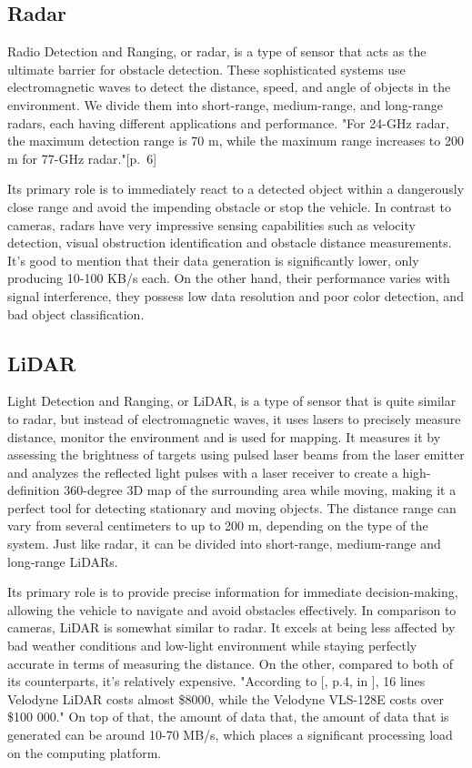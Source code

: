 \documentclass[10pt,oneside,english,a4paper]{article}
\begin{document}
\subsection{Radar}
\indent Radio Detection and Ranging, or radar, is a type of sensor that acts as the ultimate barrier for obstacle detection. These sophisticated systems use electromagnetic waves to detect the distance, speed, and angle of objects in the environment. We divide them into short-range, medium-range, and long-range radars, each having different applications and performance. "For 24-GHz radar, the maximum detection range is 70 m, while the maximum range increases to 200 m for 77-GHz radar."\cite{stateoftheart}[p.~6] 
\par Its primary role is to immediately react to a detected object within a dangerously close range and avoid the impending obstacle or stop the vehicle. In contrast to cameras, radars have very impressive sensing capabilities such as velocity detection, visual obstruction identification and obstacle distance measurements. It's good to mention that their data generation is significantly lower, only producing 10-100 KB/s each. On the other hand, their performance varies with signal interference, they possess low data resolution and poor color detection, and bad object classification. \cite{computerarch}\cite{Sensorfusion}\cite{stateoftheart}

\subsection{LiDAR}
\indent Light Detection and Ranging, or LiDAR, is a type of sensor that is quite similar to radar, but instead of electromagnetic waves, it uses lasers to precisely measure distance, monitor the environment and is used for mapping. It measures it by assessing the brightness of targets using pulsed laser beams from the laser emitter and analyzes the reflected light pulses with a laser receiver to create a high-definition 360-degree 3D map of the surrounding area while moving, making it a perfect tool for detecting stationary and moving objects. The distance range can vary from several centimeters to up to 200 m, depending on the type of the system. Just like radar, it can be divided into short-range, medium-range and long-range LiDARs. 
\par Its primary role is to provide precise information for immediate decision-making, allowing the vehicle to navigate and avoid obstacles effectively. In comparison to cameras, LiDAR is somewhat similar to radar. It excels at being less affected by bad weather conditions and low-light environment while staying perfectly accurate in terms of measuring the distance. On the other, compared to both of its counterparts, it's relatively expensive. "According to [\cite{stateoftheart}, p.4, in \cite{lidar}], 16
lines Velodyne LiDAR costs almost \$8000, while the Velodyne VLS-128E costs over \$100 000." On top of that, the amount of data that, the amount of data that is generated can be around 10-70 MB/s, which places a significant processing load on the computing platform.
\cite{AIandIoT}\cite{computerarch}\cite{stateoftheart}
\end{document}
